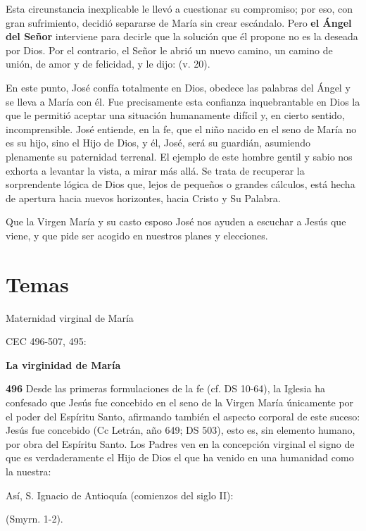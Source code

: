 \begin{body}
\begin{body}
Esta circunstancia inexplicable le llevó a cuestionar su compromiso; por eso, con gran sufrimiento, decidió separarse de María sin crear escándalo. Pero \textbf{el Ángel del Señor} interviene para decirle que la solución que él propone no es la deseada por Dios. Por el contrario, el Señor le abrió un nuevo camino, un camino de unión, de amor y de felicidad, y le dijo:  (v. 20).

En este punto, José confía totalmente en Dios, obedece las palabras del Ángel y se lleva a María con él. Fue precisamente esta confianza inquebrantable en Dios la que le permitió aceptar una situación humanamente difícil y, en cierto sentido, incomprensible. José entiende, en la fe, que el niño nacido en el seno de María no es su hijo, sino el Hijo de Dios, y él, José, será su guardián, asumiendo plenamente su paternidad terrenal. El ejemplo de este hombre gentil y sabio nos exhorta a levantar la vista, a mirar más allá. Se trata de recuperar la sorprendente lógica de Dios que, lejos de pequeños o grandes cálculos, está hecha de apertura hacia nuevos horizontes, hacia Cristo y Su Palabra.

Que la Virgen María y su casto esposo José nos ayuden a escuchar a Jesús que viene, y que pide ser acogido en nuestros planes y elecciones.

\section{Temas}

Maternidad virginal de María

CEC 496-507, 495:

\textbf{La virginidad de María}

\textbf{496} Desde las primeras formulaciones de la fe (cf. DS 10-64), la Iglesia ha confesado que Jesús fue concebido en el seno de la Virgen María únicamente por el poder del Espíritu Santo, afirmando también el aspecto corporal de este suceso: Jesús fue concebido  (Cc Letrán, año 649; DS 503), esto es, sin elemento humano, por obra del Espíritu Santo. Los Padres ven en la concepción virginal el signo de que es verdaderamente el Hijo de Dios el que ha venido en una humanidad como la nuestra:

Así, S. Ignacio de Antioquía (comienzos del siglo II):

 (Smyrn. 1-2).


\end{body}
\end{body}

